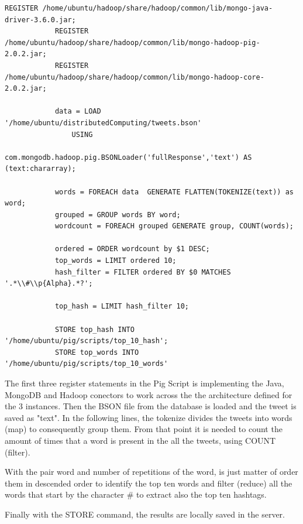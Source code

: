 \documentclass{article}
\begin{document}
        \begin{lstlisting}[caption= Tweet cleaning function, label={lst:dataCleaning}]
            REGISTER /home/ubuntu/hadoop/share/hadoop/common/lib/mongo-java-driver-3.6.0.jar;
            REGISTER /home/ubuntu/hadoop/share/hadoop/common/lib/mongo-hadoop-pig-2.0.2.jar;
            REGISTER /home/ubuntu/hadoop/share/hadoop/common/lib/mongo-hadoop-core-2.0.2.jar;
            
            data = LOAD '/home/ubuntu/distributedComputing/tweets.bson'
                USING
                com.mongodb.hadoop.pig.BSONLoader('fullResponse','text') AS (text:chararray);
            
            words = FOREACH data  GENERATE FLATTEN(TOKENIZE(text)) as word;
            grouped = GROUP words BY word;
            wordcount = FOREACH grouped GENERATE group, COUNT(words);
            
            ordered = ORDER wordcount by $1 DESC;
            top_words = LIMIT ordered 10;
            hash_filter = FILTER ordered BY $0 MATCHES '.*\\#\\p{Alpha}.*?';
            
            top_hash = LIMIT hash_filter 10;

            STORE top_hash INTO '/home/ubuntu/pig/scripts/top_10_hash';
            STORE top_words INTO '/home/ubuntu/pig/scripts/top_10_words'

        \end{lstlisting}

        The first three register statements in the Pig Script is implementing the Java, MongoDB and Hadoop conectors to work across the the architecture defined for the 3 instances. Then
        the BSON file from the database is loaded and the tweet is saved as "text". In the following lines, the tokenize divides the tweets into words (map) to consequently group them.
        From that point it is needed to count the amount of times that a word is present in the all the tweets, using COUNT (filter).
        
        With the pair word and number of repetitions of the word, is just matter of order them in descended order to identify the top ten words and filter (reduce) all the words that start by the character \# to 
        extract also the top ten hashtags.

        Finally with the STORE command, the results are locally saved in the server.
\end{document}

